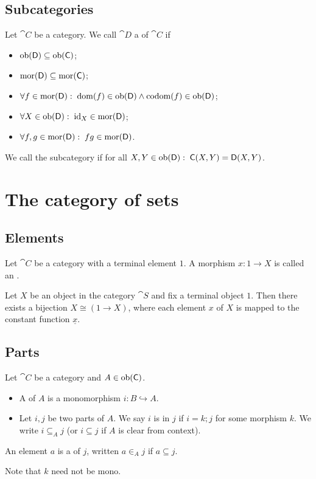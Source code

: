 \subsection{Subcategories}
\begin{definition}
Let $\cat{C}$ be a category. We call $\cat{D}$ a  of $\cat{C}$ if
\begin{itemize}
\item $\operatorname{ob}(\mathsf{D}) \subseteq \operatorname{ob}(\mathsf{C})$;
\item $\operatorname{mor}(\mathsf{D}) \subseteq \operatorname{mor}(\mathsf{C})$;
\item $\forall f\in \operatorname{mor}(\mathsf{D}): \; \operatorname{dom}(f)\in\operatorname{ob}(\mathsf{D}) \land \operatorname{codom}(f)\in\operatorname{ob}(\mathsf{D})$;
\item $\forall X\in \operatorname{ob}(\mathsf{D}): \; \operatorname{id}_X\in \operatorname{mor}(\mathsf{D})$;
\item $\forall f,g \in \operatorname{mor}(\mathsf{D}): \; fg \in \operatorname{mor}(\mathsf{D})$.
\end{itemize}
We call the subcategory  if for all $X,Y\in \operatorname{ob}(\mathsf{D}): \; \mathsf{C}(X,Y) = \mathsf{D}(X,Y)$.
\end{definition}

\section{The category of sets}
\subsection{Elements}
\begin{definition}
Let $\cat{C}$ be a category with a terminal element $1$. A morphism $x: 1\to X$ is called an .
\end{definition}

\begin{proposition} \label{elementsInCategoryOfSets}
Let $X$ be an object in the category $\cat{S}$ and fix a terminal object $1$. Then there exists a bijection $X \cong (1\to X)$, where each element $x$ of $X$ is mapped to the constant function $\underline{x}$.
\end{proposition}

\subsection{Parts}
\begin{definition}
Let $\cat{C}$ be a category and $A\in\operatorname{ob}(\mathsf{C})$.
\begin{itemize}
\item A  of $A$ is a monomorphism $i: B \hookrightarrow A$.
\item Let $i,j$ be two parts of $A$. We say $i$ is  in $j$ if $i = k;j$ for some morphism $k$. We write $i\subseteq_A j$ (or $i\subseteq j$ if $A$ is clear from context).
\end{itemize}
An element $a$ is a  of $j$, written $a\in_A j$ if $a\subseteq j$.
\end{definition}
Note that $k$ need not be mono.

